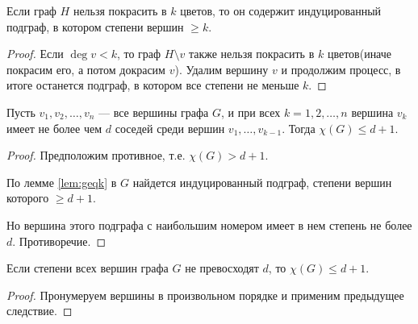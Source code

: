 \begin{lemma}
    \label{lem:geqk}
    Если граф $H$ нельзя покрасить в $k$ цветов, то он содержит индуцированный подграф, в котором степени вершин $\geq k$.
\end{lemma}

\begin{proof}
    Если $\deg{v} < k$, то граф $H \setminus v$ также нельзя покрасить в $k$ цветов(иначе покрасим его, а потом докрасим $v$). Удалим вершину $v$ и продолжим процесс, в итоге останется подграф, в котором все степени не меньше $k$.
\end{proof}

\begin{follow}
    Пусть $v_1, v_2, \ldots, v_n$ --- все вершины графа $G$, и при всех $k = 1, 2, \ldots, n$ вершина $v_k$ имеет не более чем $d$ соседей среди вершин $v_1, \ldots, v_{k-1}$. Тогда $\chi(G) \leq d + 1$.
\end{follow}

\begin{proof}
    Предположим противное, т.е. $\chi(G) > d + 1$.

    По лемме \ref*{lem:geqk} в $G$ найдется индуцированный подграф, степени вершин которого $\geq d + 1$.
    
    Но вершина этого подграфа с наибольшим номером имеет в нем степень не более $d$. Противоречие.
\end{proof}

\begin{follow}
    Если степени всех вершин графа $G$ не превосходят $d$, то $\chi(G) \leq d + 1$.
\end{follow}

\begin{proof}
    Пронумеруем вершины в произвольном порядке и применим предыдущее следствие.
\end{proof}